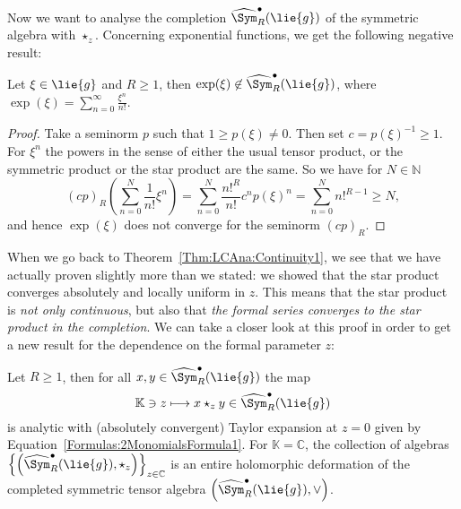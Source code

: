 Now we want to analyse the completion $\widehat{\Sym}_R^{\bullet}(\lie{g})$ of
the symmetric algebra with $\star_z$. Concerning exponential functions, we 
get the following negative result:
\begin{proposition}
    \label{proposition:NoExponentialsSorry}%
    Let $\xi \in \lie{g}$ and $R \geq 1$, then $\exp(\xi) \not\in
    \widehat{\Sym}_R^{\bullet}(\lie{g})$, where $\exp(\xi) =
    \sum_{n=0}^{\infty} \frac{\xi^n}{n!}$.
\end{proposition}
\begin{proof}
    Take a seminorm $p$ such that $1 \geq p(\xi) \neq 0$. Then set 
    $c = p(\xi)^{-1} \geq 1$. For $\xi^n$ the powers in the sense of either 
    the usual tensor product, or the symmetric product or the star product
    are the same. So we have for $N \in \mathbb{N}$
    \begin{equation*}
        (cp)_R \left(
        \sum\limits_{n=0}^N
        \frac{1}{n!} \xi^n
        \right)
        =
        \sum\limits_{n=0}^N
        \frac{n!^R}{n!}
        c^n
        p(\xi)^{n}
        =
        \sum\limits_{n=0}^N
        n!^{R - 1}
        \geq
        N,
    \end{equation*}
    and hence $\exp(\xi)$ does not converge for the seminorm $(cp)_R$.
\end{proof}
When we go back to Theorem~\ref{Thm:LCAna:Continuity1}, we see that we have 
actually proven slightly more than we stated: we showed that the star product 
converges absolutely and locally uniform in $z$. This means that the star product 
is \emph{not only continuous}, but also that \emph{the formal series converges to 
the star product in the completion}. We can take a closer look at this proof in 
order to get a new result for the dependence on the formal parameter $z$:
\begin{proposition}[Dependence on $z$]
    \label{corollary:HolomorphicDependence}%
    Let $R \geq 1$, then for all $x, y \in \widehat{\Sym}_R^\bullet(\lie{g})$ 
    the map
    \begin{equation}
        \label{LCAna:Holomorphicity}
        \mathbb{K} \ni z
        \longmapsto
        x \star_z y \in
        \widehat{\Sym}_R^\bullet(\lie{g})
    \end{equation}
    is analytic with (absolutely convergent) Taylor expansion at $z = 0$ 
    given by Equation~\eqref{Formulas:2MonomialsFormula1}. For 
    $\mathbb{K} = \mathbb{C}$, the collection of algebras $\left\{ \left( 
    \widehat{\Sym}_R^\bullet(\lie{g}), \star_z \right) \right\}_{z \in 
    \mathbb{C}}$ is an entire holomorphic deformation of the completed 
    symmetric tensor algebra $\left( \widehat{\Sym}_R^\bullet(\lie{g}), \vee 
    \right)$.
\end{proposition}
